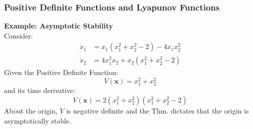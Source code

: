 \documentclass[11pt,handout]{beamer}   %
\begin{document}
\begin{frame}
\frametitle{Positive Definite Functions and Lyapunov Functions}
\small
\textbf{Example: Asymptotic Stability}\\
Consider:\\
\begin{equation*}
\begin{aligned}
\dot{x}_1 &= x_1 (x_1^2 + x_2^2 - 2) - 4x_1x_2^2\\
\dot{x}_2 &= 4x_1^2x_2 + x_2(x_1^2 + x_2^2 - 2)
\end{aligned}
\end{equation*}
Given the Positive Definite Function:
\begin{equation*}
V(\mathbf{x}) = x_1^2 + x_2^2
\end{equation*}
and its time derivative:
\begin{equation*}
\dot{V}(\mathbf{x}) = 2(x_1^2 + x_2^2)(x_1^2 + x_2^2 - 2)
\end{equation*}
About the origin, $\dot{V}$ is negative definite and the Thm. dictates that the origin is asymptotically stable.
\end{frame}
\end{document}
